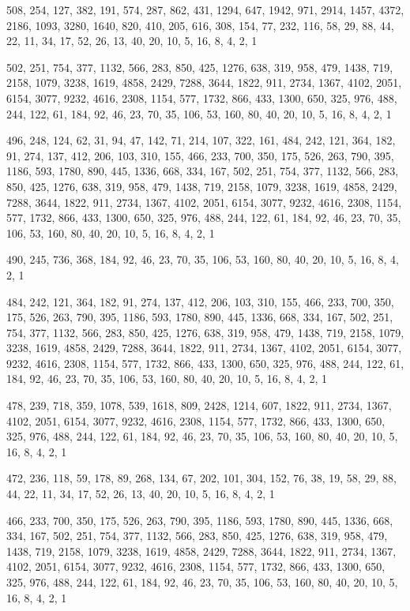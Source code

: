 \documentclass[12pt]{article}
\begin{document}
508, 254, 127, 382, 191, 574, 287, 862, 431, 1294, 647, 1942, 971, 2914, 1457, 4372, 2186, 1093, 3280, 1640, 820, 410, 205, 616, 308, 154, 77, 232, 116, 58, 29, 88, 44, 22, 11, 34, 17, 52, 26, 13, 40, 20, 10, 5, 16, 8, 4, 2, 1

502, 251, 754, 377, 1132, 566, 283, 850, 425, 1276, 638, 319, 958, 479, 1438, 719, 2158, 1079, 3238, 1619, 4858, 2429, 7288, 3644, 1822, 911, 2734, 1367, 4102, 2051, 6154, 3077, 9232, 4616, 2308, 1154, 577, 1732, 866, 433, 1300, 650, 325, 976, 488, 244, 122, 61, 184, 92, 46, 23, 70, 35, 106, 53, 160, 80, 40, 20, 10, 5, 16, 8, 4, 2, 1

496, 248, 124, 62, 31, 94, 47, 142, 71, 214, 107, 322, 161, 484, 242, 121, 364, 182, 91, 274, 137, 412, 206, 103, 310, 155, 466, 233, 700, 350, 175, 526, 263, 790, 395, 1186, 593, 1780, 890, 445, 1336, 668, 334, 167, 502, 251, 754, 377, 1132, 566, 283, 850, 425, 1276, 638, 319, 958, 479, 1438, 719, 2158, 1079, 3238, 1619, 4858, 2429, 7288, 3644, 1822, 911, 2734, 1367, 4102, 2051, 6154, 3077, 9232, 4616, 2308, 1154, 577, 1732, 866, 433, 1300, 650, 325, 976, 488, 244, 122, 61, 184, 92, 46, 23, 70, 35, 106, 53, 160, 80, 40, 20, 10, 5, 16, 8, 4, 2, 1

490, 245, 736, 368, 184, 92, 46, 23, 70, 35, 106, 53, 160, 80, 40, 20, 10, 5, 16, 8, 4, 2, 1

484, 242, 121, 364, 182, 91, 274, 137, 412, 206, 103, 310, 155, 466, 233, 700, 350, 175, 526, 263, 790, 395, 1186, 593, 1780, 890, 445, 1336, 668, 334, 167, 502, 251, 754, 377, 1132, 566, 283, 850, 425, 1276, 638, 319, 958, 479, 1438, 719, 2158, 1079, 3238, 1619, 4858, 2429, 7288, 3644, 1822, 911, 2734, 1367, 4102, 2051, 6154, 3077, 9232, 4616, 2308, 1154, 577, 1732, 866, 433, 1300, 650, 325, 976, 488, 244, 122, 61, 184, 92, 46, 23, 70, 35, 106, 53, 160, 80, 40, 20, 10, 5, 16, 8, 4, 2, 1

478, 239, 718, 359, 1078, 539, 1618, 809, 2428, 1214, 607, 1822, 911, 2734, 1367, 4102, 2051, 6154, 3077, 9232, 4616, 2308, 1154, 577, 1732, 866, 433, 1300, 650, 325, 976, 488, 244, 122, 61, 184, 92, 46, 23, 70, 35, 106, 53, 160, 80, 40, 20, 10, 5, 16, 8, 4, 2, 1

472, 236, 118, 59, 178, 89, 268, 134, 67, 202, 101, 304, 152, 76, 38, 19, 58, 29, 88, 44, 22, 11, 34, 17, 52, 26, 13, 40, 20, 10, 5, 16, 8, 4, 2, 1

466, 233, 700, 350, 175, 526, 263, 790, 395, 1186, 593, 1780, 890, 445, 1336, 668, 334, 167, 502, 251, 754, 377, 1132, 566, 283, 850, 425, 1276, 638, 319, 958, 479, 1438, 719, 2158, 1079, 3238, 1619, 4858, 2429, 7288, 3644, 1822, 911, 2734, 1367, 4102, 2051, 6154, 3077, 9232, 4616, 2308, 1154, 577, 1732, 866, 433, 1300, 650, 325, 976, 488, 244, 122, 61, 184, 92, 46, 23, 70, 35, 106, 53, 160, 80, 40, 20, 10, 5, 16, 8, 4, 2, 1
\end{document}
